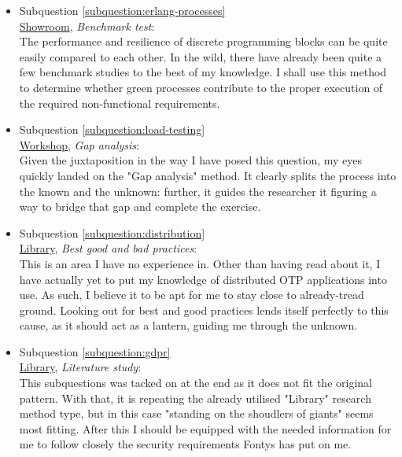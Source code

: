 \documentclass{article}
\begin{document}
    \begin{itemize}
        \item Subquestion \ref{subquestion:erlang-processes} \\
        \underline{Showroom}, \textit{Benchmark test}: \\
        The performance and resilience of discrete programming blocks can be quite easily compared to each other. In the wild, there have already been quite a few benchmark studies to the best of my knowledge. I shall use this method to determine whether green processes contribute to the proper execution of the required non-functional requirements.
        \item Subquestion \ref{subquestion:load-testing} \\
        \underline{Workshop}, \textit{Gap analysis}: \\
        Given the juxtaposition in the way I have posed this question, my eyes quickly landed on the "Gap analysis" method. It clearly splits the process into the known and the unknown: further, it guides the researcher it figuring a way to bridge that gap and complete the exercise.
        \item Subquestion \ref{subquestion:distribution} \\
        \underline{Library}, \textit{Best good and bad practices}: \\
        This is an area I have no experience in. Other than having read about it, I have actually yet to put my knowledge of distributed OTP applications into use. As such, I believe it to be apt for me to stay close to already-tread ground. Looking out for best and good practices lends itself perfectly to this cause, as it should act as a lantern, guiding me through the unknown.
        \item Subquestion \ref{subquestion:gdpr} \\
        \underline{Library}, \textit{Literature study}: \\
        This subquestions was tacked on at the end as it does not fit the original pattern. With that, it is repeating the already utilised "Library" research method type, but in this case "standing on the shoudlers of giants" seems most fitting. After this I should be equipped with the needed information for me to follow closely the security requirements Fontys has put on me.
    \end{itemize}

\newpage
\end{document}

